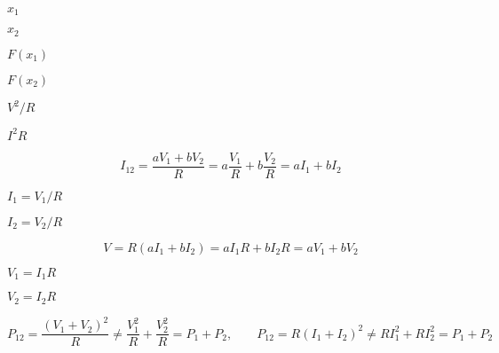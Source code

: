 {\newpage\clearpage
{}%
$x_1$%
\lthtmlinlinemathZ
\lthtmlcheckvsize\clearpage}

{\newpage\clearpage
{}%
$x_2$%
\lthtmlinlinemathZ
\lthtmlcheckvsize\clearpage}

{\newpage\clearpage
{}%
$F(x_1)$%
\lthtmlinlinemathZ
\lthtmlcheckvsize\clearpage}

{\newpage\clearpage
{}%
$F(x_2)$%
\lthtmlinlinemathZ
\lthtmlcheckvsize\clearpage}

{\newpage\clearpage
{}%
$V^2/R$%
\lthtmlinlinemathZ
\lthtmlcheckvsize\clearpage}

{\newpage\clearpage
{}%
$I^2R$%
\lthtmlinlinemathZ
\lthtmlcheckvsize\clearpage}

{\newpage\clearpage
{}%
\begin{displaymath}	I_{12}=\frac{aV_1+bV_2}{R}=a\frac{V_1}{R}+b\frac{V_2}{R}=aI_1+bI_2 \end{displaymath}%
\lthtmldisplayZ
\lthtmlcheckvsize\clearpage}

{\newpage\clearpage
{}%
$I_1=V_1/R$%
\lthtmlinlinemathZ
\lthtmlcheckvsize\clearpage}

{\newpage\clearpage
{}%
$I_2=V_2/R$%
\lthtmlinlinemathZ
\lthtmlcheckvsize\clearpage}

{\newpage\clearpage
{}%
\begin{displaymath}	V=R(aI_1+bI_2)=aI_1R+bI_2R=aV_1+bV_2 \end{displaymath}%
\lthtmldisplayZ
\lthtmlcheckvsize\clearpage}

{\newpage\clearpage
{}%
$V_1=I_1R$%
\lthtmlinlinemathZ
\lthtmlcheckvsize\clearpage}

{\newpage\clearpage
{}%
$V_2=I_2R$%
\lthtmlinlinemathZ
\lthtmlcheckvsize\clearpage}

{\newpage\clearpage
{}%
\begin{displaymath}
P_{12}=\frac{(V_1+V_2)^2}{R}\ne\frac{V_1^2}{R}+\frac{V_2^2}{R}=P_1+P_2,
\;\;\;\;\;\;\;
P_{12}=R(I_1+I_2)^2 \ne RI_1^2+RI_2^2=P_1+P_2	
\end{displaymath}%
\lthtmldisplayZ
\lthtmlcheckvsize\clearpage}

